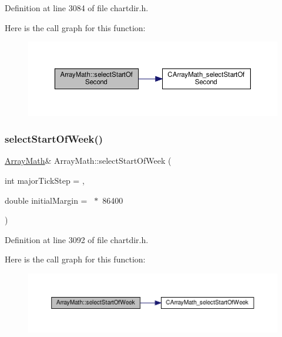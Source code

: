 Definition at line 3084 of file chartdir.\+h.

Here is the call graph for this function\+:
\nopagebreak
\begin{figure}[H]
\begin{center}
\leavevmode
\includegraphics[width=350pt]{class_array_math_ab0253df48686370fccc34f3e286521d9_cgraph}
\end{center}
\end{figure}
\mbox{\label{class_array_math_a97c624b2c158da5bcea887bec88d8fd0}} 
\subsubsection{\texorpdfstring{select\+Start\+Of\+Week()}{selectStartOfWeek()}}
{\footnotesize\ttfamily \hyperlink{class_array_math}{Array\+Math}\& Array\+Math\+::select\+Start\+Of\+Week (\begin{DoxyParamCaption}\item[{int}]{major\+Tick\+Step = {},  }\item[{double}]{initial\+Margin = {~$\ast$~86400} }\end{DoxyParamCaption})\hspace{0.3cm}{\ttfamily [inline]}}



Definition at line 3092 of file chartdir.\+h.

Here is the call graph for this function\+:
\nopagebreak
\begin{figure}[H]
\begin{center}
\leavevmode
\includegraphics[width=350pt]{class_array_math_a97c624b2c158da5bcea887bec88d8fd0_cgraph}
\end{center}
\end{figure}
\mbox{\label{class_array_math_a49a76a80a68b10357db7f0189e3bfb2f}} 
